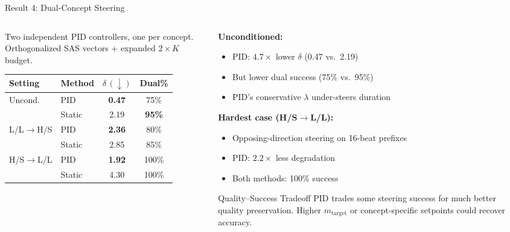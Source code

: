 \documentclass[aspectratio=169, 11pt]{beamer}
\begin{document}
\begin{frame}{Result 4: Dual-Concept Steering}

\begin{columns}[T]
\begin{column}{0.48\textwidth}
Two independent PID controllers, one per concept. Orthogonalized SAS vectors + expanded $2\times K$ budget.

\vspace{0.3em}
\begin{table}
\centering\small
\begin{tabular}{llcc}
  \toprule
  Setting & Method & $\delta\,(\downarrow)$ & Dual\% \\
  \midrule
  \multirow{2}{*}{Uncond.} & PID & \textbf{0.47} & 75\% \\
  & Static & 2.19 & \textbf{95\%} \\
  \midrule
  \multirow{2}{*}{L/L$\to$H/S} & PID & \textbf{2.36} & 80\% \\
  & Static & 2.85 & 85\% \\
  \multirow{2}{*}{H/S$\to$L/L} & PID & \textbf{1.92} & 100\% \\
  & Static & 4.30 & 100\% \\
  \bottomrule
\end{tabular}
\end{table}
\end{column}

\begin{column}{0.48\textwidth}
\textbf{Unconditioned:}
\begin{itemize}
  \item PID: $4.7\times$ lower $\delta$ (0.47 vs.\ 2.19)
  \item But lower dual success (75\% vs.\ 95\%)
  \item PID's conservative $\lambda$ under-steers duration
\end{itemize}

\vspace{0.3em}
\textbf{Hardest case (H/S$\to$L/L):}
\begin{itemize}
  \item Opposing-direction steering on 16-beat prefixes
  \item PID: $2.2\times$ less degradation
  \item Both methods: 100\% success
\end{itemize}

\vspace{0.3em}
\begin{block}{Quality--Success Tradeoff}
\small
PID trades some steering success for much better quality preservation. Higher $m_\text{target}$ or concept-specific setpoints could recover accuracy.
\end{block}
\end{column}
\end{columns}


\end{frame}
\end{document}
